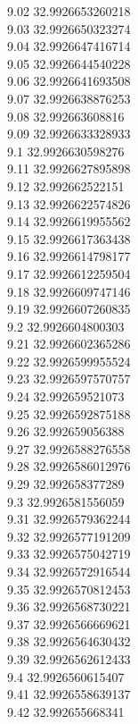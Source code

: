 {9.02	32.9926653260218\\
9.03	32.9926650323274\\
9.04	32.9926647416714\\
9.05	32.9926644540228\\
9.06	32.9926641693508\\
9.07	32.9926638876253\\
9.08	32.992663608816\\
9.09	32.9926633328933\\
9.1	32.9926630598276\\
9.11	32.9926627895898\\
9.12	32.992662522151\\
9.13	32.9926622574826\\
9.14	32.9926619955562\\
9.15	32.9926617363438\\
9.16	32.9926614798177\\
9.17	32.9926612259504\\
9.18	32.9926609747146\\
9.19	32.9926607260835\\
9.2	32.9926604800303\\
9.21	32.9926602365286\\
9.22	32.9926599955524\\
9.23	32.9926597570757\\
9.24	32.992659521073\\
9.25	32.9926592875188\\
9.26	32.992659056388\\
9.27	32.9926588276558\\
9.28	32.9926586012976\\
9.29	32.992658377289\\
9.3	32.9926581556059\\
9.31	32.9926579362244\\
9.32	32.9926577191209\\
9.33	32.9926575042719\\
9.34	32.9926572916544\\
9.35	32.9926570812453\\
9.36	32.9926568730221\\
9.37	32.9926566669621\\
9.38	32.9926564630432\\
9.39	32.9926562612433\\
9.4	32.9926560615407\\
9.41	32.9926558639137\\
9.42	32.992655668341\\
}
